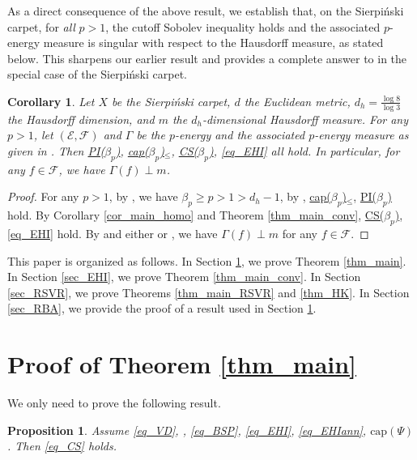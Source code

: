 \documentclass[11pt,a4paper]{article}
\numberwithin{equation}{section}
\theoremstyle{plain}
\newtheorem{proposition}[theorem]{Proposition}
\newtheorem{corollary}[theorem]{Corollary}
\theoremstyle{definition}
\begin{document}
As a direct consequence of the above result, we establish that, on the Sierpi\'nski carpet, for \emph{all} $p>1$, the cutoff Sobolev inequality holds and the associated $p$-energy measure is singular with respect to the Hausdorff measure, as stated below. This sharpens our earlier result \cite[Corollary 2.5]{Yan25c} and provides a complete answer to \cite[Problem 10.5]{MS25} in the special case of the Sierpi\'nski carpet.

\begin{corollary}\label{cor_SC_singular}
Let $X$ be the Sierpi\'nski carpet, $d$ the Euclidean metric, $d_h=\frac{\log8}{\log3}$ the Hausdorff dimension, and $m$ the $d_h$-dimensional Hausdorff measure. For any $p>1$, let $(\mathcal{E},\mathcal{F})$ and $\Gamma$ be the $p$-energy and the associated $p$-energy measure as given in \cite{MS25}. Then \hyperlink{eq_PIbeta}{PI($\beta_p$)}, \hyperlink{eq_capbeta}{cap($\beta_p$)$_\le$}, \hyperlink{eq_CSbeta}{CS($\beta_p$)}, \ref{eq_EHI} all hold. In particular, for any $f\in\mathcal{F}$, we have $\Gamma(f)\perp m$.
\end{corollary}

\begin{proof}
For any $p>1$, by \cite[Proposition 8.8 (i)]{MS25}, we have $\beta_p\ge p>1>d_h-1$, by \cite[Proposition 6.21, Theorem 8.21]{MS25}, \hyperlink{eq_capbeta}{cap($\beta_p$)$_\le$}, \hyperlink{eq_PIbeta}{PI($\beta_p$)} hold. By Corollary \ref{cor_main_homo} and Theorem \ref{thm_main_conv}, \hyperlink{eq_CSbeta}{CS($\beta_p$)}, \ref{eq_EHI} hold. By \cite[Theorem 2.1]{Yan25c} and either \cite[Theorem 9.8]{KS24a} or \cite[Corollary 2.2]{Yan25e}, we have $\Gamma(f)\perp m$ for any $f\in\mathcal{F}$.
\end{proof}

This paper is organized as follows. In Section \ref{sec_CS}, we prove Theorem \ref{thm_main}. In Section \ref{sec_EHI}, we prove Theorem \ref{thm_main_conv}. In Section \ref{sec_RSVR}, we prove Theorems \ref{thm_main_RSVR} and \ref{thm_HK}. In Section \ref{sec_RBA}, we provide the proof of a result used in Section \ref{sec_CS}.

\section{Proof of Theorem \ref{thm_main}}\label{sec_CS}

We only need to prove the following result.

\begin{proposition}\label{prop_main_CS}
Assume \ref{eq_VD}, \hyperlink{eq_LSC}{}, \ref{eq_BSP}, \ref{eq_EHI}, \ref{eq_EHIann}, \hyperlink{eq_cap}{$\text{cap}(\Psi)$}. Then \ref{eq_CS} holds.
\end{proposition}
\end{document}
